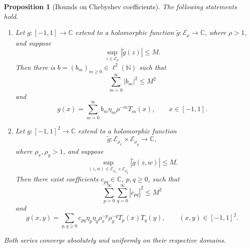\documentclass[11pt]{article}
\newtheorem{proposition}[proposition]{Proposition}
\theoremstyle{definition}
\theoremstyle{remark}
\newcommand{\C}{\mathbb{C}}
\newcommand{\cE}{\mathcal{E}}
\newcommand{\abs}[1]{\left\lvert #1\right\rvert}
\begin{document}
\begin{proposition}[Bounds on Chebyshev coefficients]
\label{prop:weighted-chebyshev}
The following statements hold.
\begin{enumerate}
\item Let $g:[-1,1]\to\C$ extend to a holomorphic function
$\widetilde g:\cE_\rho\to\C$, where $\rho>1$, and suppose
\begin{equation}
    \sup_{z\in\cE_\rho}\abs{\widetilde g(z)}\le M.
    \label{eq:weighted-chebyshev-extension-bound}
\end{equation}
Then there is $b=(b_m)_{m\ge0}\in\ell^2(\mathbb N)$ such that
\begin{equation}
    \sum_{m=0}^\infty\abs{b_m}^2\le M^2
    \label{eq:weighted-chebyshev-norm}
\end{equation}
and
\begin{equation}
    g(x)
    =
    \sum_{m=0}^\infty
    b_m\eta_m\rho^{-m}T_m(x),
    \qquad x\in [-1, 1].
    \label{eq:weighted-chebyshev-expansion}
\end{equation}
\item Let $g:[-1,1]^2\to\C$ extend to a holomorphic function
\[
    \widetilde g:
    \cE_{\rho_x}\times\cE_{\rho_y}\to\C,
\]
where $\rho_x,\rho_y>1$, and suppose
\begin{equation}
    \sup_{(z,w)\in\cE_{\rho_x}\times\cE_{\rho_y}}
    \abs{\widetilde g(z,w)}
    \le M.
    \label{eq:weighted-bivariate-chebyshev-extension-bound}
\end{equation}
Then there exist coefficients $c_{pq}\in\C$, $p,q\ge0$, such that
\begin{equation}
    \sum_{p=0}^{\infty} \sum_{q=0}^{\infty} \abs{c_{pq}}^2
    \le
    M^2
    \label{eq:weighted-bivariate-chebyshev-norm}
\end{equation}
and
\begin{equation}
    g(x,y)
    =
    \sum_{p,q\ge0}
    c_{pq}\eta_p\eta_q
    \rho_x^{-p}\rho_y^{-q}T_p(x)T_q(y),
    \qquad (x,y)\in [-1, 1]^2.
    \label{eq:weighted-bivariate-chebyshev-expansion}
\end{equation}
\end{enumerate}
Both series converge absolutely and uniformly on their respective
domains.
\end{proposition}
\end{document}

